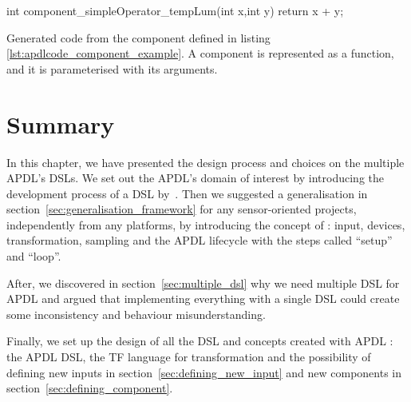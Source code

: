 \begin{listing}[H]
  \centering
\begin{cppcode}
int component_simpleOperator_tempLum(int x,int y) {
  return x + y;
}
\end{cppcode}
  \caption[Generated code for an \gls{APDL}'s component]{Generated code from the
component defined in listing \ref{lst:apdlcode_component_example}. A component is
represented as a function, and it is parameterised with its arguments.}
  \label{lst:component_generated}
\end{listing}

\section{Summary}
\label{sec:design_summary}

In this chapter, we have presented the design process and choices on the multiple
\gls{APDL}'s \gls{DSL}s. We set out the \gls{APDL}'s domain of interest by
introducing the development process of a \gls{DSL}
by~\cite{little_languages_little_maintenance}. Then we suggested a
generalisation in section~\ref{sec:generalisation_framework} for any sensor-oriented
projects, independently from any platforms, by introducing the concept of : input, devices,
transformation, sampling and the \gls{APDL} lifecycle with the steps called
``setup'' and ``loop''.

After, we discovered in section~\ref{sec:multiple_dsl} why we need multiple \gls{DSL} for \gls{APDL} and argued that
implementing everything with a single \gls{DSL} could create some inconsistency
and behaviour misunderstanding.

Finally, we set up the design of all the \gls{DSL} and concepts created with
\gls{APDL} : the \gls{APDL} \gls{DSL}, the \gls{TF}
language for transformation and the possibility of defining new
inputs in section~\ref{sec:defining_new_input} and new
components in section~\ref{sec:defining_component}.

